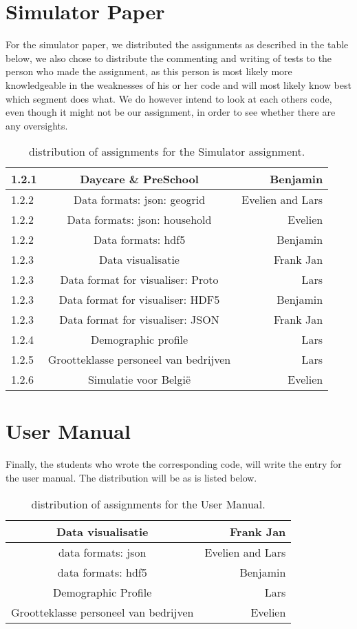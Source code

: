 \documentclass{article}
\begin{document}
\section{Simulator Paper}
For the simulator paper, we distributed the assignments as described in the table below, we also chose to distribute the commenting and writing of tests to the person who made the assignment, as this person is most likely more knowledgeable in the weaknesses of his or her code and will most likely know best which segment does what. We do however intend to look at each others code, even though it might not be our assignment, in order to see whether there are any oversights.
\begin{table}[h!]
	\centering
	\begin{tabular}{| l | c | r |}
		\hline
		1.2.1 & Daycare \& PreSchool & Benjamin \\
		\hline
		1.2.2 & Data formats: json: geogrid & Evelien and Lars \\
		\hline
		1.2.2 & Data formats: json: household & Evelien \\
		\hline
		1.2.2 & Data formats: hdf5 & Benjamin \\
		\hline
		1.2.3 & Data visualisatie & Frank Jan \\
		\hline
		1.2.3 & Data format for visualiser: Proto & Lars\\
		\hline
		1.2.3 & Data format for visualiser: HDF5 & Benjamin \\
		\hline
		1.2.3 & Data format for visualiser: JSON & Frank Jan \\
		\hline
		1.2.4 & Demographic profile & Lars \\
		\hline
		1.2.5 & Grootteklasse personeel van bedrijven & Lars \\
		\hline
		1.2.6 & Simulatie voor Belgi\"e & Evelien \\
		\hline
	\end{tabular}
	\caption{distribution of assignments for the Simulator assignment.}
\end{table}
\section{User Manual}
Finally, the students who wrote the corresponding code, will write the entry for the user manual. The distribution will be as is listed below.
\begin{table}[h!]
	\centering
	\begin{tabular}{| c | r |}
		\hline
		Data visualisatie & Frank Jan \\
		\hline
		data formats: json & Evelien and Lars \\
		\hline
		data formats: hdf5 & Benjamin \\
		\hline
		Demographic Profile & Lars \\
		\hline
		Grootteklasse personeel van bedrijven & Evelien \\
		\hline
	\end{tabular}
	\caption{distribution of assignments for the User Manual.}
\end{table}
\end{document}
